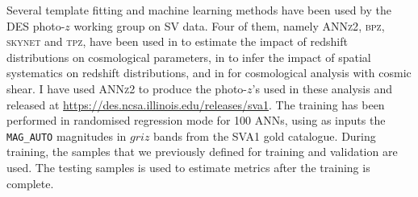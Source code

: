Several template fitting and machine learning methods have been used by the DES photo-$z$ working group on SV data. Four of them, namely \textsc{ANNz2}, \textsc{bpz}, \textsc{skynet} and \textsc{tpz}, have been used in \citet{bonnett} to estimate the impact of redshift distributions on cosmological parameters, in \citet{leistedt16} to infer the impact of spatial systematics on redshift distributions, and in \citet{SVkey} for cosmological analysis with cosmic shear.
I have used \textsc{ANNz2} to produce the photo-$z$'s used in these analysis and released at \url{https://des.ncsa.illinois.edu/releases/sva1}. The training has been performed in randomised regression mode for 100 ANNs, using as inputs the \texttt{MAG\_AUTO} magnitudes in $griz$ bands from the SVA1 gold catalogue. During training, the samples that we previously defined for training and validation are used. The testing samples is used to estimate metrics after the training is complete.

